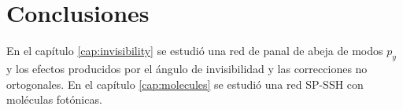 \chapter{Conclusiones}

En el capítulo \ref{cap:invisibility} se estudió una red de panal de abeja de modos $p_y$ y los efectos producidos por el ángulo de invisibilidad y las correcciones no ortogonales. 
En el capítulo \ref{cap:molecules} se estudió una red SP-SSH con moléculas fotónicas.